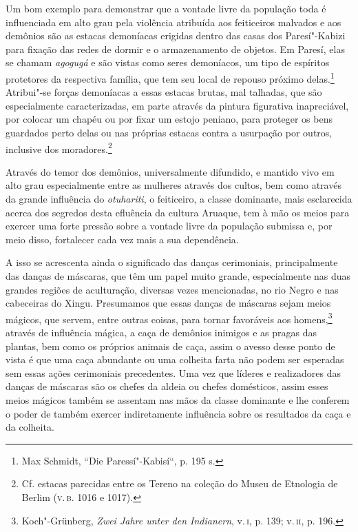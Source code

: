 Um bom exemplo para demonstrar que a vontade livre da população toda é
influenciada em alto grau pela violência atribuída aos feiticeiros
malvados e aos demônios são as estacas demoníacas erigidas dentro das
casas dos Paresí"-Kabizi para fixação das redes de dormir e o
armazenamento de objetos. Em Paresí, elas se chamam \emph{agogugá} e são
vistas como seres demoníacos, um tipo de espíritos protetores da
respectiva família, que tem seu local de repouso próximo delas.\footnote{Max
  Schmidt, ``Die Paressí"-Kabisí``, p. 195 s.} Atribui"-se forças
demoníacas a essas estacas brutas, mal talhadas, que são especialmente
caracterizadas, em parte através da pintura figurativa inapreciável, por
colocar um chapéu ou por fixar um estojo peniano, para proteger os bens
guardados perto delas ou nas próprias estacas contra a usurpação por
outros, inclusive dos moradores.\footnote{Cf. estacas parecidas entre os
  Tereno na coleção do Museu de Etnologia de Berlim (\textsc{v.\,b.} 1016 e 1017).}


Através do temor dos demônios, universalmente difundido, e mantido vivo
em alto grau especialmente entre as mulheres através dos cultos, bem
como através da grande influência do \emph{otuhariti}, o feiticeiro, a
classe dominante, mais esclarecida acerca dos segredos desta efluência
da cultura Aruaque, tem à mão os meios para exercer uma forte pressão
sobre a vontade livre da população submissa e, por meio disso,
fortalecer cada vez mais a sua dependência.

A isso se acrescenta ainda o significado das danças cerimoniais,
principalmente das danças de máscaras, que têm um papel muito grande,
especialmente nas duas grandes regiões de aculturação, diversas vezes
mencionadas, no rio Negro e nas cabeceiras do Xingu. Presumamos que
essas danças de máscaras sejam meios mágicos, que servem, entre outras
coisas, para tornar favoráveis aos homens,\footnote{Koch"-Grünberg,
  \emph{Zwei Jahre unter den Indianern}, v.\,\textsc{i}, p. 139; v.\,\textsc{ii}, p. 196.}
através de influência mágica, a caça de demônios inimigos e as pragas
das plantas, bem como os próprios animais de caça, assim o avesso desse
ponto de vista é que uma caça abundante ou uma colheita farta não podem
ser esperadas sem essas ações cerimoniais precedentes. Uma vez que
líderes e realizadores das danças de máscaras são os chefes da aldeia ou
chefes domésticos, assim esses meios mágicos também se assentam nas
mãos da classe dominante e lhe conferem o poder de também exercer
indiretamente influência sobre os resultados da caça e da colheita.

